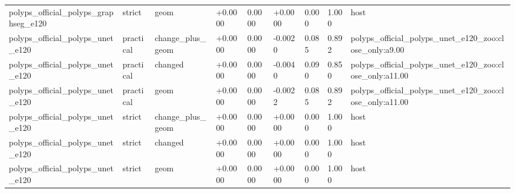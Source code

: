 \begin{table}[t]
\begin{tabular}{lllllllll}
polyps\_official\_polyps\_graphseg\_e120 & strict & geom & +0.0000 & 0.0000 & +0.0000 & 0.000 & 1.000 & host \\
polyps\_official\_polyps\_unet\_e120 & practical & change\_plus\_geom & +0.0000 & 0.0000 & -0.0020 & 0.085 & 0.892 & polyps\_official\_polyps\_unet\_e120\_zoo:close\_only:a9.00 \\
polyps\_official\_polyps\_unet\_e120 & practical & changed & +0.0000 & 0.0000 & -0.0040 & 0.090 & 0.850 & polyps\_official\_polyps\_unet\_e120\_zoo:close\_only:a11.00 \\
polyps\_official\_polyps\_unet\_e120 & practical & geom & +0.0000 & 0.0000 & -0.0022 & 0.085 & 0.892 & polyps\_official\_polyps\_unet\_e120\_zoo:close\_only:a11.00 \\
polyps\_official\_polyps\_unet\_e120 & strict & change\_plus\_geom & +0.0000 & 0.0000 & +0.0000 & 0.000 & 1.000 & host \\
polyps\_official\_polyps\_unet\_e120 & strict & changed & +0.0000 & 0.0000 & +0.0000 & 0.000 & 1.000 & host \\
polyps\_official\_polyps\_unet\_e120 & strict & geom & +0.0000 & 0.0000 & +0.0000 & 0.000 & 1.000 & host \\
\bottomrule
\end{tabular}
\end{table}
